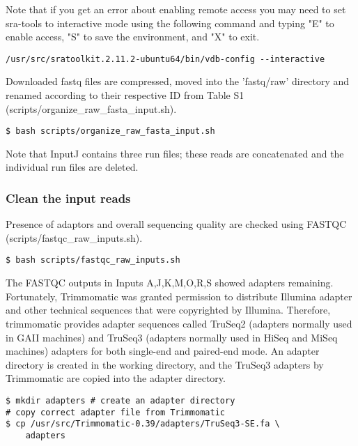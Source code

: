 \documentclass{article}
\begin{document}
\begin{sloppypar}
Note that if you get an error about enabling remote access you may need to set sra-tools to interactive mode using the following command and typing "E" to enable access, "S" to save the environment, and "X" to exit. 

\begin{verbatim}
/usr/src/sratoolkit.2.11.2-ubuntu64/bin/vdb-config --interactive
\end{verbatim}

Downloaded fastq files are compressed, moved into the 'fastq/raw' directory and renamed according to their respective ID from Table S1 ({\selectfont scripts/organize\_raw\_fasta\_input.sh}).

\begin{verbatim}
$ bash scripts/organize_raw_fasta_input.sh
\end{verbatim}

Note that InputJ contains three run files; these reads are concatenated and the individual run files are deleted.

\subsubsection{Clean the input reads}

Presence of adaptors and overall sequencing quality are checked using FASTQC ({\selectfont scripts/fastqc\_raw\_inputs.sh}). 

\begin{verbatim}
$ bash scripts/fastqc_raw_inputs.sh
\end{verbatim}

The FASTQC outputs in Inputs A,J,K,M,O,R,S showed adapters remaining. Fortunately, Trimmomatic was granted permission to distribute Illumina adapter and other technical sequences that were copyrighted by Illumina. Therefore, trimmomatic provides adapter sequences called TruSeq2 (adapters normally used in GAII machines) and TruSeq3 (adapters normally used in HiSeq and MiSeq machines) adapters for both single-end and paired-end mode. An adapter directory is created in the working directory, and the TruSeq3 adapters by Trimmomatic are copied into the adapter directory.

\begin{verbatim}
$ mkdir adapters # create an adapter directory
# copy correct adapter file from Trimmomatic
$ cp /usr/src/Trimmomatic-0.39/adapters/TruSeq3-SE.fa \
    adapters
\end{verbatim}


\end{sloppypar}
\end{document}
